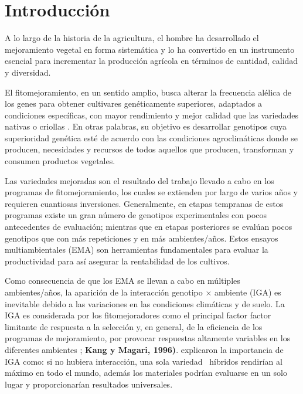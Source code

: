 

\chapter{Introducción}

A lo largo de la historia de la agricultura, el hombre ha desarrollado el mejoramiento vegetal en forma sistemática y lo ha convertido en un instrumento esencial para incrementar la producción agrícola en términos de cantidad, calidad y diversidad.  

El fitomejoramiento, en un sentido amplio, busca alterar la frecuencia alélica de los genes para obtener cultivares  genéticamente superiores, adaptados a condiciones específicas, con mayor rendimiento y mejor calidad que las variedades nativas o criollas \citep{Allard67}. En otras palabras, su objetivo es desarrollar genotipos cuya superioridad genética esté de acuerdo con las condiciones agroclimáticas donde se producen, necesidades y recursos de todos aquellos que producen, transforman y consumen productos vegetales. 

Las variedades mejoradas son el resultado del trabajo llevado a cabo en los programas de fitomejoramiento, los cuales se extienden por largo de varios años y requieren cuantiosas inversiones. Generalmente, en etapas tempranas de estos programas existe un gran número de genotipos experimentales con pocos antecedentes de evaluación; mientras que en etapas posteriores  se evalúan pocos genotipos que con más repeticiones y en más ambientes/años. Estos ensayos multiambientales (EMA) son herramientas fundamentales para evaluar la productividad para así asegurar la rentabilidad de los cultivos.

Como consecuencia de que los EMA se llevan a cabo en múltiples ambientes/años, la aparición de la interacción genotipo $\times$ ambiente (IGA) es inevitable debido a las variaciones en las condiciones climáticas y de suelo. La IGA es considerada por los fitomejoradores como el principal factor factor limitante de  respuesta a la selección y, en general, de la eficiencia de los programas de mejoramiento, por provocar respuestas altamente variables en los diferentes ambientes \citep{Crossaetal1990, CruzMedina1992}; \textbf{Kang y Magari, 1996)}. \citet{GauchZobel1997} explicaron la importancia de IGA como: si no hubiera interacción, una sola variedad \ híbridos rendirían al máximo en todo el mundo, además los materiales podrían evaluarse en un solo lugar y proporcionarían resultados universales.


